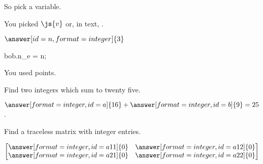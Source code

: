 \documentclass{ximera}
\begin{document}
\begin{problem}


  So pick a variable.
  \begin{multipleChoice}[id=v]
  \end{multipleChoice}

  You picked $\js{v}$ or, in text, .



  $\answer[id=n,format=integer]{3}$

  \begin{javascript}
    bob.n_e = n;
  \end{javascript}
  
  \begin{validator}[bob.n_e == 3]
  

  \end{validator}

  You used  points.

\end{problem}

\begin{problem}
  Find two integers which sum to twenty five.

  \begin{validator}[a+b==25]
    $\answer[format=integer,id=a]{16} + \answer[format=integer,id=b]{9} = 25$.
  \end{validator}

  Find a traceless matrix with integer entries.
  \begin{validator}[a11+a22==0]
    \[
      \begin{bmatrix}
        \answer[format=integer,id=a11]{0} &         \answer[format=integer,id=a12]{0} \\
        \answer[format=integer,id=a21]{0} &         \answer[format=integer,id=a22]{0} \\
      \end{bmatrix}
      \]
  \end{validator}


\end{problem}
\end{document}
